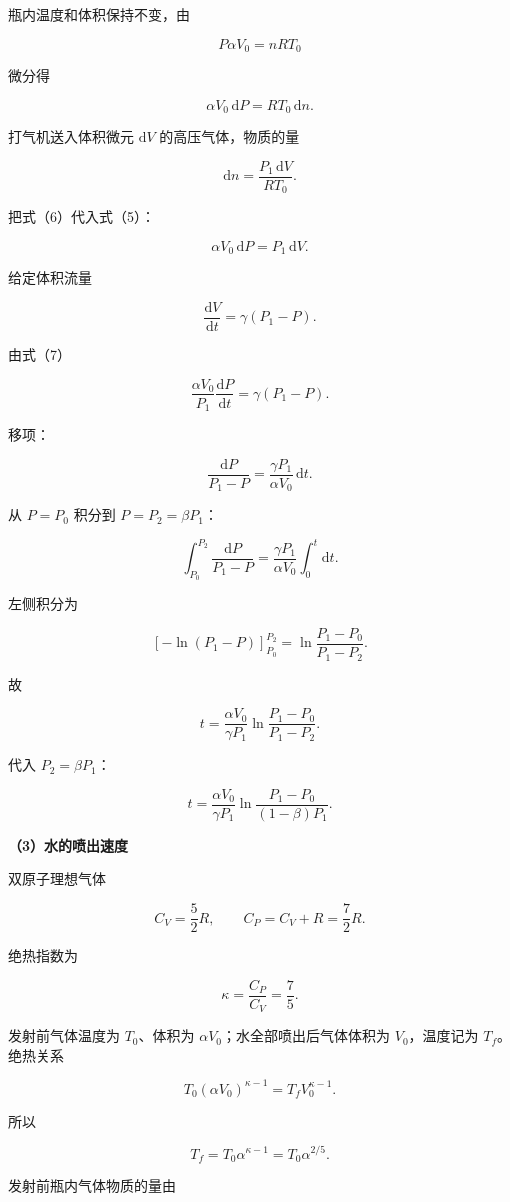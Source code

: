 \documentclass[12pt,a4paper,UTF8]{ctexart}
\begin{document}
瓶内温度和体积保持不变，由

\[
P\alpha V_0=nRT_0
\]

微分得

\[
\alpha V_0\,\mathrm dP=RT_0\,\mathrm dn.
\tag{5}
\]

打气机送入体积微元 \(\mathrm dV\) 的高压气体，物质的量

\[
\mathrm dn=\frac{P_1\,\mathrm dV}{RT_0}.
\tag{6}
\]

把式（6）代入式（5）：

\[
\alpha V_0\,\mathrm dP=P_1\,\mathrm dV.
\tag{7}
\]

给定体积流量

\[
\frac{\mathrm dV}{\mathrm dt}
=\gamma(P_1-P).
\tag{8}
\]

由式（7）

\[
\frac{\alpha V_0}{P_1}\frac{\mathrm dP}{\mathrm dt}
=\gamma(P_1-P).
\]

移项：

\[
\frac{\mathrm dP}{P_1-P}
=\frac{\gamma P_1}{\alpha V_0}\,\mathrm dt.
\tag{9}
\]

从 \(P=P_0\) 积分到 \(P=P_2=\beta P_1\)：

\[
\int_{P_0}^{P_2}
\frac{\mathrm dP}{P_1-P}
=\frac{\gamma P_1}{\alpha V_0}\int_0^t\mathrm dt.
\]

左侧积分为

\[
\left[-\ln(P_1-P)\right]_{P_0}^{P_2}
=\ln\frac{P_1-P_0}{P_1-P_2}.
\]

故

\[
t
=\frac{\alpha V_0}{\gamma P_1}
\ln\frac{P_1-P_0}{P_1-P_2}.
\]

代入 \(P_2=\beta P_1\)：

\[
\boxed{
t=\frac{\alpha V_0}{\gamma P_1}
\ln\frac{P_1-P_0}{(1-\beta)P_1}
}.
\tag{10}
\]

\textbf{（3）水的喷出速度}

双原子理想气体

\[
C_V=\frac52R,
\qquad
C_P=C_V+R=\frac72R.
\]

绝热指数为

\[
\kappa=\frac{C_P}{C_V}=\frac75.
\tag{11}
\]

发射前气体温度为 \(T_0\)、体积为 \(\alpha V_0\)；水全部喷出后气体体积为
\(V_0\)，温度记为 \(T_f\)。绝热关系

\[
T_0(\alpha V_0)^{\kappa-1}
=T_fV_0^{\kappa-1}.
\]

所以

\[
T_f=T_0\alpha^{\kappa-1}
=T_0\alpha^{2/5}.
\tag{12}
\]

发射前瓶内气体物质的量由
\end{document}

